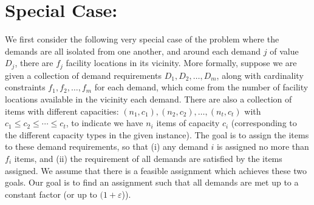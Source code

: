 \section{Special Case: \cckp}
We first consider the following very special case of the \mckc problem where the demands are all isolated from one another, and around each demand $j$ of value $D_j$, there are $f_j$ facility locations in its vicinity. More formally, suppose we are given a collection of demand requirements $D_1, D_2, \ldots, D_m$, along with cardinality constraints $f_1, f_2, \ldots, f_m$ for each demand, which come from the number of facility locations available in the vicinity each demand. There are also a collection of items with different capacities: $(n_1,c_1), (n_2,c_2),\ldots, (n_t,c_t)$
with $c_1 \leq c_2 \le \cdots \le c_t$,
to indicate we have $n_i$ items of capacity $c_i$ (corresponding to the different capacity types in the given \mckc instance). The goal is to assign the items to these demand requirements, so that (i) any demand $i$ is assigned no more than $f_i$ items, and (ii) the requirement of all demands are satisfied by the items assigned. We assume that there is a feasible assignment which achieves these two goals. Our goal is to find an assignment such that all demands are met up to a constant factor (or up to $(1+\varepsilon$)). 



